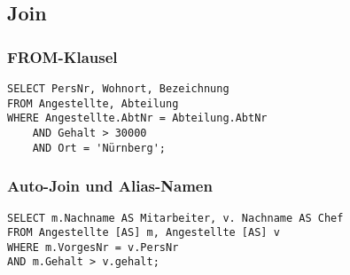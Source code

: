 \subsection{Join}
\subsubsection{FROM-Klausel}
\begin{verbatim}
SELECT PersNr, Wohnort, Bezeichnung
FROM Angestellte, Abteilung
WHERE Angestellte.AbtNr = Abteilung.AbtNr 
	AND Gehalt > 30000
	AND Ort = 'Nürnberg';
\end{verbatim}
\subsubsection{Auto-Join und Alias-Namen}
\begin{verbatim}
SELECT m.Nachname AS Mitarbeiter, v. Nachname AS Chef
FROM Angestellte [AS] m, Angestellte [AS] v
WHERE m.VorgesNr = v.PersNr
AND m.Gehalt > v.gehalt;
\end{verbatim}








